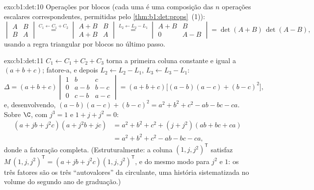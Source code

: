 \begin{solution}{exo:b1:det:10}
Operações por blocos (cada uma é uma composição das $n$ operações
escalares correspondentes, permitidas pelo \cref{thm:b1:det:props}~(1)):
\[
\begin{vmatrix} A & B\\ B & A\end{vmatrix}
\overset{C_1 \leftarrow C_1 + C_2}{=}
\begin{vmatrix} A + B & B\\ A + B & A\end{vmatrix}
\overset{L_2 \leftarrow L_2 - L_1}{=}
\begin{vmatrix} A + B & B\\ 0 & A - B\end{vmatrix}
= \det(A+B)\,\det(A-B),
\]
usando a regra triangular por blocos no último passo.
\end{solution}

\begin{solution}{exo:b1:det:11}
$C_1 \leftarrow C_1 + C_2 + C_3$ torna a primeira coluna constante e igual a $(a + b + c)$; fatore-a, e
depois $L_2 \leftarrow L_2 - L_1$, $L_3 \leftarrow L_3 - L_1$:
\[
\Delta = (a+b+c)\begin{vmatrix}
1 & b & c\\
0 & a - b & b - c\\
0 & c - b & a - c
\end{vmatrix}
= (a+b+c)\bigl[(a-b)(a-c) + (b-c)^2\bigr],
\]
e, desenvolvendo, $(a-b)(a-c) + (b-c)^2 = a^2 + b^2 + c^2 - ab - bc
- ca$. Sobre $\C$, com $j^3 = 1$ e $1 + j + j^2 = 0$:
\begin{align*}
(a + jb + j^2c)(a + j^2b + jc)
&= a^2 + b^2 + c^2 + (j + j^2)(ab + bc + ca)\\
&= a^2 + b^2 + c^2 - ab - bc - ca ,
\end{align*}
donde a fatoração completa. (Estruturalmente: a coluna $(1, j, j^2)^{\mathsf T}$
satisfaz $M\,(1, j, j^2)^{\mathsf T}
= (a + jb + j^2c)(1, j, j^2)^{\mathsf T}$, e do mesmo modo para $j^2$ e $1$: os três fatores
são os três ``autovalores'' da circulante, uma história
sistematizada no volume do segundo ano de graduação.)
\end{solution}

